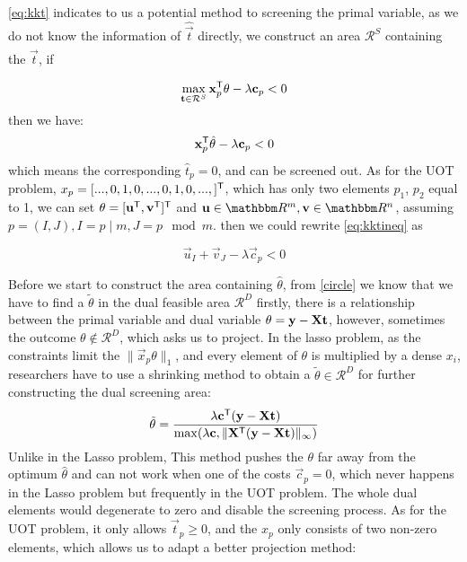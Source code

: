 \ref{eq:kkt} indicates to us a potential method to screening the primal variable, as we do not know the information of $\hat{\vec{t}}$ directly, we construct an area $\mathcal{R}^{S}$ containing the $\hat{\vec{t}}$, if

\begin{equation}
\max_{\mathbf{t} \in \mathcal{R}^S} \mathbf{x}_p^{\mathsf T}\theta -\lambda \mathbf{c}_p < 0
\end{equation}
then we have:
 \begin{equation}
 \mathbf{x}_p^{\mathsf T}\hat{\theta} -\lambda \mathbf{c}_p < 0 
 \label{eq:kktineq}
\end{equation}
which means the corresponding $\hat{t}_p = 0$, and can be screened out.
As for the UOT problem, $x_p = [...,0,1,0,...,0,1,0,...,]^{\mathsf T}$, which has only two elements $p_1$, $p_2$ equal to 1, we can set $\theta = [\mathbf{u}^{\mathsf T},\mathbf{v}^{\mathsf T}]^{\mathsf T}$ and $\vec{u}\in\R^{m}, \vec{v}\in\R^{n}$, assuming $p=(I,J), I = p \mid m, J = p \mod m$. then we could rewrite \ref{eq:kktineq} as 

 \begin{equation}
\vec{u}_{I} + \vec{v}_{J}-\lambda \vec{c}_p < 0
\end{equation}

Before we start to construct the area containing $\hat{\theta}$, from \ref{circle} we know that we have to find a $\tilde{\theta}$ in the dual feasible area $\mathcal{R}^{D}$ firstly, there is a relationship between the primal variable and dual variable $\theta = \mathbf{y} - \mathbf{X}\mathbf{t}$, however, sometimes the outcome $\theta \notin \mathcal{R}^{D}$, which asks us to project. In the lasso problem, as the constraints limit the $\|\vec{x}_p \theta\|_1$, and every element of $\theta$ is multiplied by a dense $x_i$, researchers have to use a shrinking method to obtain a $\tilde{\theta} \in \mathcal{R}^{D}$ for further constructing the dual screening area: 
\begin{equation}
\tilde{\theta} = \frac{\lambda \mathbf{c} ^{\mathsf T}(\mathbf{y} - \mathbf{X} \mathbf{t})}{\max(\lambda \mathbf{c}, \|\mathbf{X}^{\mathsf T}(\mathbf{y}-\mathbf{X}\mathbf{t})\|_{\infty})}
\end{equation}
Unlike in the Lasso problem, This method pushes the $\theta$ far away from the optimum $\hat{\theta}$ and can not work when one of the costs $\vec{c}_p = 0$, which never happens in the Lasso problem but frequently in the UOT problem. The whole dual elements would degenerate to zero and disable the screening process. As for the UOT problem, it only allows $\vec{t}_p \geq 0$, and the $x_p$ only consists of two non-zero elements, which allows us to adapt a better projection method:


